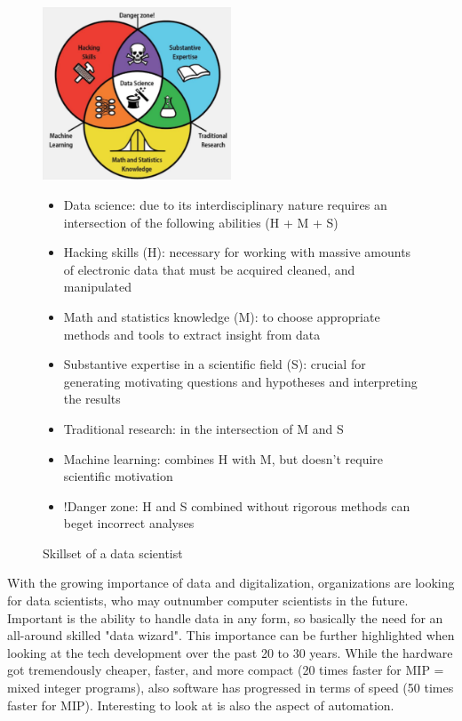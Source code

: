 \begin{figure}[H]
  \centering
  \includegraphics[width=0.5\textwidth]{assets/intro/data_scientist_skillset.png} 
  \begin{note}
    \begin{itemize}
      \item Data science: due to its interdisciplinary nature requires an intersection of the following abilities (H + M + S)
      \item Hacking skills (H): necessary for working with massive amounts of electronic data that must be acquired cleaned, and manipulated
      \item Math and statistics knowledge (M): to choose appropriate methods and tools to extract insight from data
      \item Substantive expertise in a scientific field (S): crucial for generating motivating questions and hypotheses and interpreting the results
      \item Traditional research: in the intersection of M and S
      \item Machine learning: combines H with M, but doesn't require scientific motivation
      \item !Danger zone: H and S combined without rigorous methods can beget incorrect analyses
    \end{itemize}
  \end{note}
  \caption{Skillset of a data scientist}
  \label{fig:0_skillset}
\end{figure}

With the growing importance of data and digitalization, organizations are looking for data scientists, who may outnumber computer scientists in the future. Important is the ability to handle data in any form, so basically the need for an all-around skilled "data wizard". This importance can be further highlighted when looking at the tech development over the past 20 to 30 years. While the hardware got tremendously cheaper, faster, and more compact (20 times faster for MIP = mixed integer programs), also software has progressed in terms of speed (50 times faster for MIP). Interesting to look at is also the aspect of automation.

